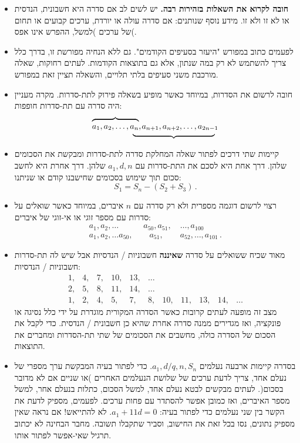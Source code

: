 \documentclass[12pt,a4paper]{article}
\begin{document}
\begin{itemize}
\item
\textbf{חובה לקרוא את השאלות בזהירות רבה.}
יש לשים לב אם סדרה היא חשבונית, הנדסית או לא זו ולא זו. מידע נוסף שנותנים: אם סדרה עולה או יורדת, ערכים קבועים או תחום של ערכים )למשל, ההפרש אינו אפס(.
\item 
לפעמים כתוב במפורש "היעזר בסעיפים הקודמים". גם ללא הנחיה מפורשת זו, בדרך כלל צריך להשתמש לא רק במה שנתון, אלא גם בתוצאות הקודמות. לעתים רחוקות, שאלה מורכבת משני סעיפים בלתי תלויים, והשאלה תציין זאת במפורש.
\item
חובה לרשום את הסדרות, במיוחד כאשר מופיע בשאלה פירוק לתת-סדרות. מקרה מעניין היה סדרה עם תת-סדרות חופפות:
\[
\renewcommand{\arraystretch}{.4}
\begin{array}{ll}
\overbrace{\rule{0pt}{8pt}a_1, a_2, \ldots, a_n},&\hspace{-9pt}a_{n+1}, a_{n+2}, \ldots, a_{2n-1}\\
&\hspace{-2em}\underbrace{\rule{10em}{0pt}}
\end{array}
\]
\vspace{-4ex}
\item
קיימות שתי דרכים לפתור שאלה המחלקת סדרה לתת-סדרות ומבקשת את הסכומים שלהן. דרך אחת היא לסכם את התת-סדרות עם
$a_1, d, n$
שלהן. דרך אחרת היא לחשב סכום תוך שימוש בסכומים שחישבנו קודם או שניתנו:
\[
S_1 = S_n - (S_2+S_3)\,.
\]
\vspace{-6ex}
\item
רצוי לרשום דוגמה מספרית ולא רק סדרה עם 
$n$
איברים, במיוחד כאשר שואלים על סדרות עם מספר זוגי או אי-זוגי של איברים:
\[
\begin{array}{l}
a_1, a_2, \ldots \quad\quad\quad a_{50}, a_{51}, \quad \ldots, a_{100}\\
a_1, a_2, \ldots a_{50}, \quad\quad a_{51}, \quad\quad a_{52}, \ldots, a_{101}\,.
\end{array}
\]
\vspace{-4ex}
\item 
מאוד שכיח ששואלים על סדרה
\textbf{שאיננה}
חשבוניות / הנדסיות אבל שיש לה תת-סדרות חשבוניות / הנדסיות:
\[
\begin{array}{rrrrrrrrrrr}
1,& 4,& 7,& 10,& 13,& \ldots\\
2,& 5,& 8,& 11,& 14, &\ldots\\
1,& 2,& 4,& 5,& 7,& 8,& 10,& 11,& 13,& 14, &\ldots
\end{array}
\]
מצב זה מופעה לעתים קרובות כאשר הסדרה המקורית מוגדרת על ידי כלל נסיגה או פונקציה, ואז מגדירים ממנה סדרה אחרת שהיא כן חשבונית / הנדסית. כדי לקבל את הסכום של הסדרה כולה, מחשבים את הסכומים של שתי תת-הסדרות ומחברים את התוצאות.
\item
בסדרה קיימות ארבעה נעלמים
$a_1, d / q, n, S_n$.
כדי לפתור בעיה המבקשת ערך מספרי של נעלם אחד, צריך לדעת ערכים של שלושת הנעלמים האחרים )או שניים אם לא מדובר בסכום(. לעתים מבקשים לבטא נעלם אחד, למשל הסכום, כתלות בנעלם אחר, למשל מספר האיברים, ואז כמובן אפשר להסתדר עם פחות ערכים. לפעמים, מספיק לדעת את הקשר בין שני נעלמים כדי לפתור בעיה:
$a_1+11d = 0$.
לא להתייאש! אם נראה שאין מספיק נתונים, נסו בכל זאת את החישוב, וסביר שתקבלו תשובה. מחבר הבחינה לא יכתוב תרגיל שאי-אפשר לפתור אותו.

\end{itemize}
\end{document}
